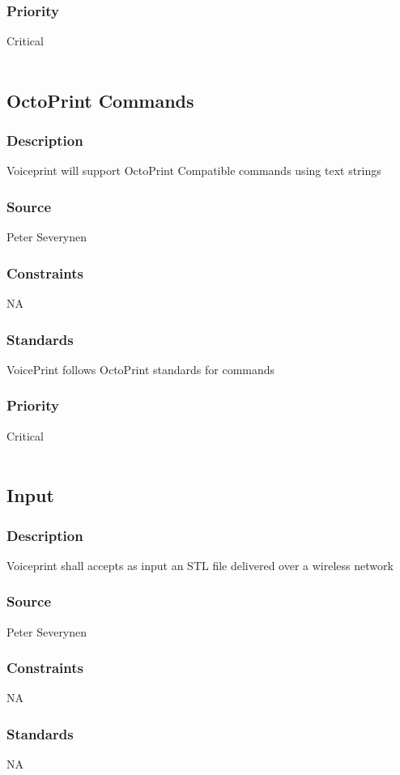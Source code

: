 \subsubsection{Priority}
Critical \\
\\
\subsection{OctoPrint Commands}
\subsubsection{Description}
Voiceprint will support OctoPrint Compatible commands using text strings
\subsubsection{Source}
Peter Severynen
\subsubsection{Constraints}
NA
\subsubsection{Standards}
VoicePrint follows OctoPrint standards for commands
\subsubsection{Priority}
Critical \\
\\
\subsection{Input}
\subsubsection{Description}
Voiceprint shall accepts as input an STL file delivered over a wireless network
\subsubsection{Source}
Peter Severynen
\subsubsection{Constraints}
NA
\subsubsection{Standards}
NA
